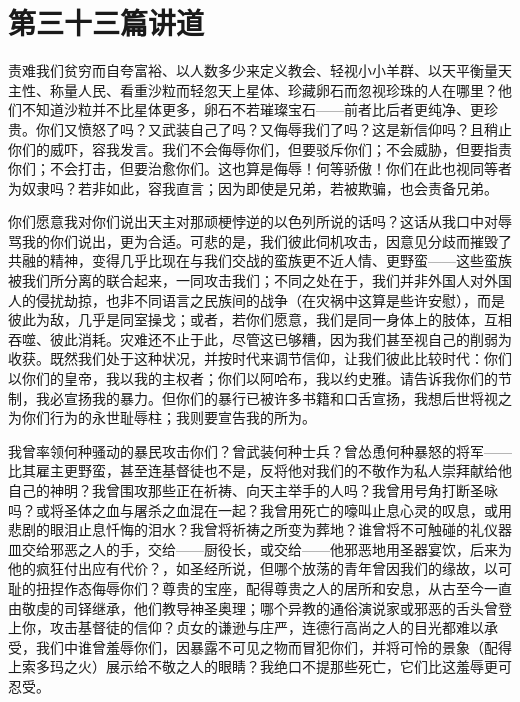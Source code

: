 
\section{第三十三篇讲道}

\par

\par

责难我们贫穷而自夸富裕、以人数多少来定义教会、轻视小小羊群、以天平衡量天主性、称量人民、看重沙粒而轻忽天上星体、珍藏卵石而忽视珍珠的人在哪里？他们不知道沙粒并不比星体更多，卵石不若璀璨宝石——前者比后者更纯净、更珍贵。你们又愤怒了吗？又武装自己了吗？又侮辱我们了吗？这是新信仰吗？且稍止你们的威吓，容我发言。我们不会侮辱你们，但要驳斥你们；不会威胁，但要指责你们；不会打击，但要治愈你们。这也算是侮辱！何等骄傲！你们在此也视同等者为奴隶吗？若非如此，容我直言；因为即使是兄弟，若被欺骗，也会责备兄弟。\par

你们愿意我对你们说出天主对那顽梗悖逆的以色列所说的话吗？这话从我口中对辱骂我的你们说出，更为合适。可悲的是，我们彼此伺机攻击，因意见分歧而摧毁了共融的精神，变得几乎比现在与我们交战的蛮族更不近人情、更野蛮——这些蛮族被我们所分离的联合起来，一同攻击我们；不同之处在于，我们并非外国人对外国人的侵扰劫掠，也非不同语言之民族间的战争（在灾祸中这算是些许安慰），而是彼此为敌，几乎是同室操戈；或者，若你们愿意，我们是同一身体上的肢体，互相吞噬、彼此消耗。灾难还不止于此，尽管这已够糟，因为我们甚至视自己的削弱为收获。既然我们处于这种状况，并按时代来调节信仰，让我们彼此比较时代：你们以你们的皇帝，我以我的主权者；你们以阿哈布，我以约史雅。请告诉我你们的节制，我必宣扬我的暴力。但你们的暴行已被许多书籍和口舌宣扬，我想后世将视之为你们行为的永世耻辱柱；我则要宣告我的所为。\par

我曾率领何种骚动的暴民攻击你们？曾武装何种士兵？曾怂恿何种暴怒的将军——比其雇主更野蛮，甚至连基督徒也不是，反将他对我们的不敬作为私人崇拜献给他自己的神明？我曾围攻那些正在祈祷、向天主举手的人吗？我曾用号角打断圣咏吗？或将圣体之血与屠杀之血混在一起？我曾用死亡的嚎叫止息心灵的叹息，或用悲剧的眼泪止息忏悔的泪水？我曾将祈祷之所变为葬地？谁曾将不可触碰的礼仪器皿交给邪恶之人的手，交给——厨役长，或交给——他邪恶地用圣器宴饮，后来为他的疯狂付出应有代价？，如圣经所说，但哪个放荡的青年曾因我们的缘故，以可耻的扭捏作态侮辱你们？尊贵的宝座，配得尊贵之人的居所和安息，从古至今一直由敬虔的司铎继承，他们教导神圣奥理；哪个异教的通俗演说家或邪恶的舌头曾登上你，攻击基督徒的信仰？贞女的谦逊与庄严，连德行高尚之人的目光都难以承受，我们中谁曾羞辱你们，因暴露不可见之物而冒犯你们，并将可怜的景象（配得上索多玛之火）展示给不敬之人的眼睛？我绝口不提那些死亡，它们比这羞辱更可忍受。\par


